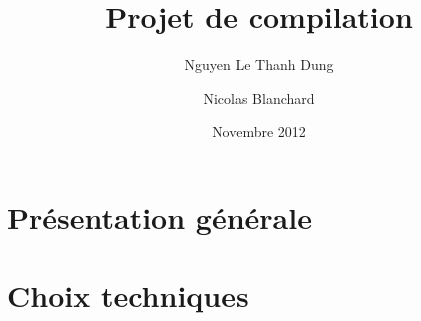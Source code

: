 \documentclass[a4paper, 11pt]{article}
\begin{document}
 
\title{Projet de compilation}
\author{Nguyen Le Thanh Dung \and Nicolas Blanchard}
\date{Novembre 2012}
\maketitle

\section{Présentation générale}


\section{Choix techniques}


 
\end{document}
